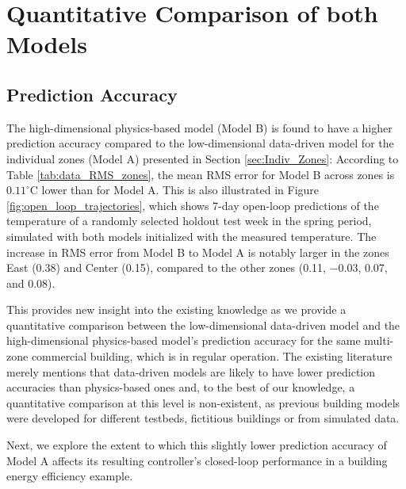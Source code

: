 
\section{Quantitative Comparison of both Models}
\label{sec:Comparison}

\subsection{Prediction Accuracy}\label{sec:prediction_accuracy}
The high-dimensional physics-based model (Model B) is found to have a higher prediction accuracy compared to the low-dimensional data-driven model for the individual zones (Model A) presented in Section \ref{sec:Indiv_Zones}: According to Table \ref{tab:data_RMS_zones}, the mean RMS error for Model B across zones is $0.11^\circ \text{C}$ lower than for Model A. This is also illustrated in Figure \ref{fig:open_loop_trajectories}, which shows 7-day open-loop predictions of the temperature of a randomly selected holdout test week in the spring period, simulated with both models initialized with the measured temperature. The increase in RMS error from Model B to Model A is notably larger in the zones East (0.38) and Center (0.15), compared to the other zones (0.11, $-$0.03, 0.07, and 0.08). 

This provides new insight into the existing knowledge as we provide a quantitative comparison between the low-dimensional data-driven model and the high-dimensional physics-based model's prediction accuracy for the same multi-zone commercial building, which is in regular operation. The existing literature merely mentions that data-driven models are likely to have lower prediction accuracies than physics-based ones and, to the best of our knowledge, a quantitative comparison at this level is non-existent, as previous building models were developed for different testbeds, fictitious buildings or from simulated data.

Next, we explore the extent to which this slightly lower prediction accuracy of Model A affects its resulting controller's closed-loop performance in a building energy efficiency example.

